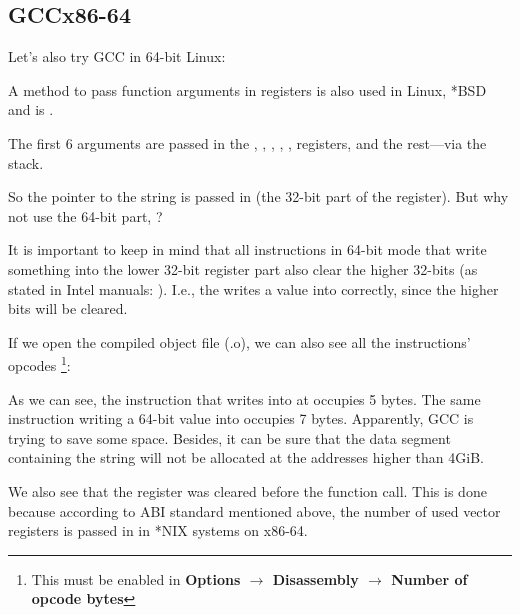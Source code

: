 \subsection{GCC\EMDASH{}x86-64}

Let's also try GCC in 64-bit Linux:



A method to pass function arguments in registers is also used in Linux, *BSD and \MacOSX is \SysVABI.

The first 6 arguments are passed in the \RDI, \RSI, \RDX, \RCX, ,   registers, and the rest---via the stack.

So the pointer to the string is passed in \EDI (the 32-bit part of the register).
But why not use the 64-bit part, \RDI?

It is important to keep in mind that all \MOV instructions in 64-bit mode that write something into the lower 32-bit register part also clear the higher 32-bits (as stated in Intel manuals: ).
I.e., the  writes a value into \RAX correctly, since the higher bits will be cleared.

If we open the compiled object file (.o), we can also see all the instructions' opcodes
\footnote{This must be enabled in \textbf{Options $\rightarrow$ Disassembly $\rightarrow$ Number of opcode bytes}}:



\label{hw_EDI_instead_of_RDI}
As we can see, the instruction that writes into \EDI at  occupies 5 bytes.
The same instruction writing a 64-bit value into \RDI occupies 7 bytes.
Apparently, GCC is trying to save some space.
Besides, it can be sure that the data segment containing the string will not be allocated at the addresses higher than 4\gls{GiB}.

\label{SysVABI_input_EAX}
We also see that the \EAX register was cleared before the \printf function call.
This is done because according to ABI standard mentioned above,
the number of used vector registers is passed in \EAX in *NIX systems on x86-64.

